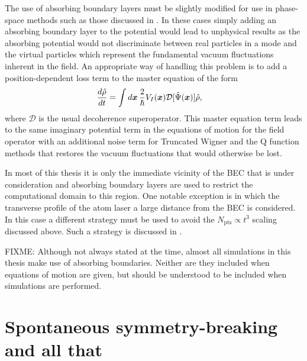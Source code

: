 The use of absorbing boundary layers must be slightly modified for use in phase-space methods such as those discussed in . In these cases simply adding an absorbing boundary layer to the potential would lead to unphysical results as the absorbing potential would not discriminate between real particles in a mode and the virtual particles which represent the fundamental vacuum fluctuations inherent in the field. An appropriate way of handling this problem is to add a position-dependent loss term to the master equation of the form
\begin{align}
    \label{BackgroundTheory:PhaseSpaceAbsorbingBoundaryLayer}
    \frac{d \hat{\rho}}{dt} &= \int d \vect{x}\, \frac{2}{\hbar}V_I(\vect{x})\mathcal{D}[\hat{\Psi}(\vect{x})]\hat{\rho},
\end{align}
where $\mathcal{D}$ is the usual decoherence superoperator. This master equation term leads to the same imaginary potential term in the equations of motion for the field operator with an additional noise term for Truncated Wigner and the Q function methods that restores the vacuum fluctuations that would otherwise be lost.

\parasep

In most of this thesis it is only the immediate vicinity of the BEC that is under consideration and absorbing boundary layers are used to restrict the computational domain to this region. One notable exception is  in which the transverse profile of the atom laser a large distance from the BEC is considered. In this case a different strategy must be used to avoid the $N_\text{pts} \propto t^3$ scaling discussed above. Such a strategy is discussed in .

FIXME: Although not always stated at the time, almost all simulations in this thesis make use of absorbing boundaries.  Neither are they included when equations of motion are given, but should be understood to be included when simulations are performed.

\section{Spontaneous symmetry-breaking and all that}
\label{BackgroundTheory:SymmetryBreaking}

